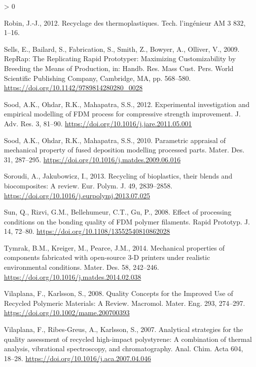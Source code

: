 \documentclass[
]{article}
\newlength{\cslhangindent}
\newenvironment{CSLReferences}[2] %
 {%
  \setlength{\parindent}{0pt}
  \ifodd #1 \everypar{\setlength{\hangindent}{\cslhangindent}}\ignorespaces\fi
  \ifnum #2 > 0
  \setlength{\parskip}{#2\baselineskip}
  \fi
 }%
 {}
\begin{document}
\begin{CSLReferences}{1}{0}
\leavevmode\hypertarget{ref-Robin2012}{}%
Robin, J.-J., 2012. {Recyclage des thermoplastiques}. Tech.
l'ing{é}nieur AM 3 832, 1--16.

\leavevmode\hypertarget{ref-Sells2009a}{}%
Sells, E., Bailard, S., Fabrication, S., Smith, Z., Bowyer, A., Olliver,
V., 2009. {RepRap: The Replicating Rapid Prototyper: Maximizing
Customizability by Breeding the Means of Production}, in: Handb. Res.
Mass Cust. Pers. World Scientific Publishing Company, Cambridge, MA, pp.
568--580. \url{https://doi.org/10.1142/9789814280280_0028}

\leavevmode\hypertarget{ref-Sood2012}{}%
Sood, A.K., Ohdar, R.K., Mahapatra, S.S., 2012. {Experimental
investigation and empirical modelling of FDM process for compressive
strength improvement}. J. Adv. Res. 3, 81--90.
\url{https://doi.org/10.1016/j.jare.2011.05.001}

\leavevmode\hypertarget{ref-Sood2010}{}%
Sood, A.K., Ohdar, R.K., Mahapatra, S.S., 2010. {Parametric appraisal of
mechanical property of fused deposition modelling processed parts}.
Mater. Des. 31, 287--295.
\url{https://doi.org/10.1016/j.matdes.2009.06.016}

\leavevmode\hypertarget{ref-Soroudi2013}{}%
Soroudi, A., Jakubowicz, I., 2013. {Recycling of bioplastics, their
blends and biocomposites: A review}. Eur. Polym. J. 49, 2839--2858.
\url{https://doi.org/10.1016/j.eurpolymj.2013.07.025}

\leavevmode\hypertarget{ref-Sun2008}{}%
Sun, Q., Rizvi, G.M., Bellehumeur, C.T., Gu, P., 2008. {Effect of
processing conditions on the bonding quality of FDM polymer filaments}.
Rapid Prototyp. J. 14, 72--80.
\url{https://doi.org/10.1108/13552540810862028}

\leavevmode\hypertarget{ref-Tymrak2014a}{}%
Tymrak, B.M., Kreiger, M., Pearce, J.M., 2014. {Mechanical properties of
components fabricated with open-source 3-D printers under realistic
environmental conditions}. Mater. Des. 58, 242--246.
\url{https://doi.org/10.1016/j.matdes.2014.02.038}

\leavevmode\hypertarget{ref-Vilaplana2008}{}%
Vilaplana, F., Karlsson, S., 2008. {Quality Concepts for the Improved
Use of Recycled Polymeric Materials: A Review}. Macromol. Mater. Eng.
293, 274--297. \url{https://doi.org/10.1002/mame.200700393}

\leavevmode\hypertarget{ref-Vilaplana2007}{}%
Vilaplana, F., Ribes-Greus, A., Karlsson, S., 2007. {Analytical
strategies for the quality assessment of recycled high-impact
polystyrene: A combination of thermal analysis, vibrational
spectroscopy, and chromatography}. Anal. Chim. Acta 604, 18--28.
\url{https://doi.org/10.1016/j.aca.2007.04.046}


\end{CSLReferences}
\end{document}
